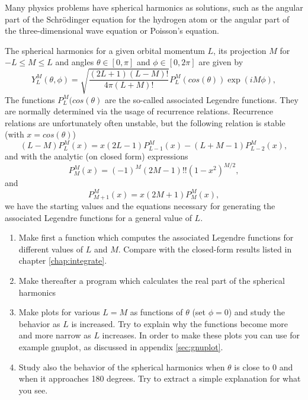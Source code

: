 \begin{prob}
Many physics problems have spherical harmonics as solutions, such as the angular part of
the Schr\"odinger equation for the hydrogen atom or the angular part of the three-dimensional 
wave equation or Poisson's equation. 

The spherical harmonics for a given orbital momentum $L$, its projection $M$ for 
$-L \le M \le L$ and angles $\theta \in [0,\pi]$ and
$\phi \in [0, 2\pi]$ are given by 
\[
  Y_L^M(\theta, \phi)=\sqrt{\frac{(2L+1)(L-M)!}{4\pi (L+M)!}}
                      P_L^M(cos(\theta))\exp{(iM\phi)},
\]
The functions $P_L^M(cos(\theta)$ are the so-called associated Legendre functions. 
They are normally determined
via the usage of recurrence relations. Recurrence relations are unfortunately often unstable,
but the following relation is stable  (with $x=cos(\theta)$)
\[
(L-M)P_L^M(x) = x(2L-1)P_{L-1}^M(x)-(L+M-1)P_{L-2}^M(x),
\]
and with the analytic (on closed form) expressions  
\[
P_M^M(x) = (-1)^M(2M-1)!!(1-x^2)^{M/2},
\]
and
\[
P_{M+1}^M(x) = x(2M+1)P_{M}^M(x),
\]
we have the starting values and the equations necessary for generating the associated Legendre
functions for a general value of $L$. 

\begin{enumerate}
\item  Make first a function which computes the associated Legendre functions
for different values of $L$ and $M$. Compare with the closed-form results listed in
chapter \ref{chap:integrate}. 
\item 
      Make thereafter a  program which calculates the real part of the 
      spherical harmonics 

\item Make plots for various $L=M$ as functions of $\theta$ (set $\phi=0$)
   and study the behavior as $L$ is increased.  Try to explain why 
   the functions become more and more narrow as $L$ increases.  In order to make these plots
you can use for example gnuplot, as discussed in appendix \ref{sec:gnuplot}.
\item  Study also the behavior of the spherical harmonics when $\theta$
   is close to 0 and when it approaches 180 degrees. Try to extract
   a simple explanation for what you see.
\end{enumerate}
\end{prob}


